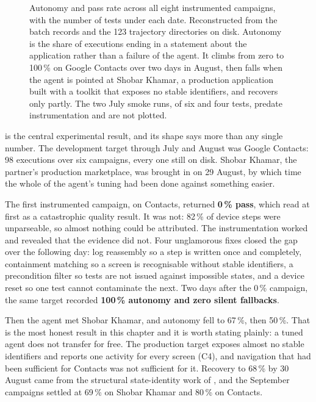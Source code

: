 \begin{figure}[htbp]
  \caption[Autonomy and pass rate across every instrumented campaign]{Autonomy
  and pass rate across all eight instrumented campaigns, with the number of
  tests under each date. Reconstructed from the batch records and the 123
  trajectory directories on disk. Autonomy is the share of executions ending in
  a statement about the application rather than a failure of the agent. It
  climbs from zero to 100\,\% on Google Contacts over two days in August, then
  falls when the agent is pointed at Shobar Khamar, a production application
  built with a toolkit that exposes no stable identifiers, and recovers only
  partly. The two July smoke runs, of six and four tests, predate
  instrumentation and are not plotted.}
  \label{fig:campaigns}
\end{figure}

 is the central experimental result, and its shape says more
than any single number. The development target through July and August was
Google Contacts: 98 executions over six campaigns, every one still on disk.
Shobar Khamar, the partner's production marketplace, was brought in on 29
August, by which time the whole of the agent's tuning had been done against
something easier.

The first instrumented campaign, on Contacts, returned \textbf{0\,\% pass},
which read at first as a catastrophic quality result. It was not: 82\,\% of device steps were
unparseable, so almost nothing could be attributed. The instrumentation worked
and revealed that the evidence did not. Four unglamorous fixes closed the gap
over the following day: log reassembly so a step is written once and
completely, containment matching so a screen is recognisable without stable
identifiers, a precondition filter so tests are not issued against impossible
states, and a device reset so one test cannot contaminate the next. Two days
after the 0\,\% campaign, the same target recorded \textbf{100\,\% autonomy and
zero silent fallbacks}.

Then the agent met Shobar Khamar, and autonomy fell to 67\,\%, then 50\,\%.
That is the most honest result in this chapter and it is worth stating plainly:
a tuned agent does not transfer for free. The production target exposes almost
no stable identifiers and reports one activity for every screen (C4), and
navigation that had been sufficient for Contacts was not sufficient for it.
Recovery to 68\,\% by 30 August came from the structural state-identity work of
, and the September campaigns settled at 69\,\% on
Shobar Khamar and 80\,\% on Contacts.

